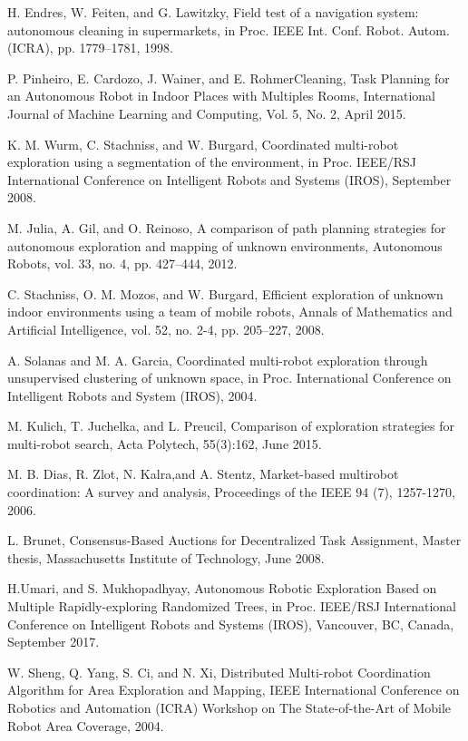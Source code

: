 \documentclass[letterpaper, 10 pt, conference]{ieeeconf}  %
\begin{document}
\begin{thebibliography}{99}
 H. Endres, W. Feiten, and G. Lawitzky, Field test of a navigation system: autonomous cleaning in supermarkets, in Proc. IEEE Int. Conf. Robot. Autom. (ICRA), pp. 1779–1781, 1998.

 P. Pinheiro, E. Cardozo, J. Wainer, and E. RohmerCleaning, Task Planning for an Autonomous Robot in Indoor Places with Multiples Rooms, International Journal of Machine Learning and Computing, Vol. 5, No. 2, April 2015.

 K. M. Wurm, C. Stachniss, and W. Burgard, Coordinated multi-robot exploration using a segmentation of the environment, in Proc. IEEE/RSJ  International Conference on Intelligent Robots and Systems (IROS), September 2008.

 M. Julia, A. Gil, and O. Reinoso, A comparison of path planning strategies for autonomous exploration and mapping of unknown environments, Autonomous Robots, vol. 33, no. 4, pp. 427–444, 2012. 

 C. Stachniss, O. M. Mozos, and W. Burgard, Efficient exploration of unknown indoor environments using a team of mobile robots, Annals of Mathematics and Artificial Intelligence, vol. 52, no. 2-4, pp. 205–227, 2008.

 A. Solanas and M. A. Garcia, Coordinated multi-robot exploration through unsupervised clustering of unknown space, in Proc.  International Conference on Intelligent Robots and System (IROS), 2004.

 M. Kulich, T. Juchelka, and L. Preucil, Comparison of exploration strategies for multi-robot search, Acta Polytech, 55(3):162, June 2015. 

 M. B. Dias, R. Zlot, N. Kalra,and A. Stentz, Market-based multirobot coordination: A survey and analysis, Proceedings of the IEEE 94 (7), 1257-1270, 2006.

 L. Brunet, Consensus-Based Auctions for Decentralized Task Assignment, Master thesis, Massachusetts Institute of Technology, June 2008.

 H.Umari, and S. Mukhopadhyay, Autonomous Robotic Exploration Based on Multiple Rapidly-exploring Randomized Trees,  in Proc. IEEE/RSJ International Conference on Intelligent Robots and Systems (IROS), Vancouver, BC, Canada, September 2017.
  
 W. Sheng, Q. Yang, S. Ci, and N. Xi, Distributed Multi-robot Coordination Algorithm for Area Exploration and Mapping, IEEE International Conference on Robotics and Automation (ICRA) Workshop on The State-of-the-Art of Mobile Robot Area Coverage, 2004.


\end{thebibliography}
\end{document}
